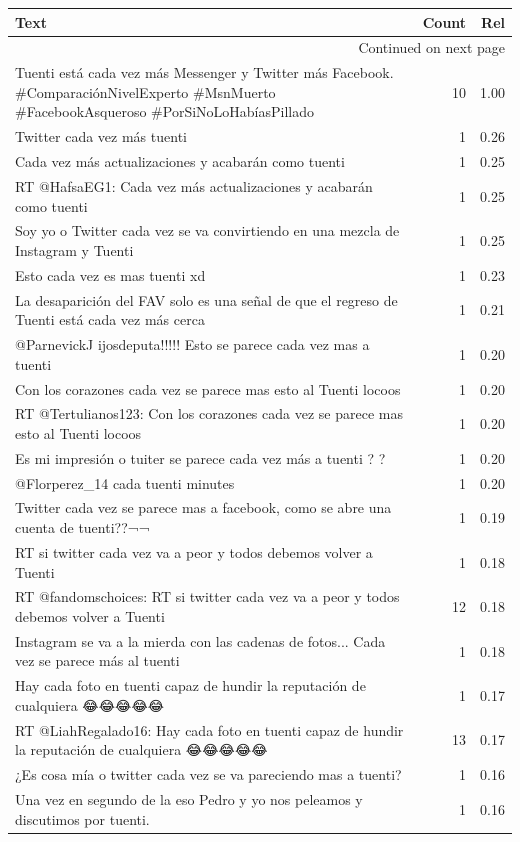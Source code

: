 \begin{longtable}{p{12.5cm}rr}
\toprule
Text & Count & Rel \\
\midrule
\endhead
\midrule
\multicolumn{3}{r}{{Continued on next page}} \\
\midrule
\endfoot

\bottomrule
\endlastfoot
Tuenti está cada vez más Messenger y Twitter más Facebook. \#ComparaciónNivelExperto \#MsnMuerto \#FacebookAsqueroso \#PorSiNoLoHabíasPillado & 10 & 1.00 \\
Twitter cada vez más tuenti & 1 & 0.26 \\
Cada vez más actualizaciones y acabarán como tuenti & 1 & 0.25 \\
RT @HafsaEG1: Cada vez más actualizaciones y acabarán como tuenti & 1 & 0.25 \\
Soy yo o Twitter cada vez se va convirtiendo en una mezcla de Instagram y Tuenti & 1 & 0.25 \\
Esto cada vez es mas tuenti xd & 1 & 0.23 \\
La desaparición del FAV solo es una señal de que el regreso de Tuenti está cada vez más cerca & 1 & 0.21 \\
@ParnevickJ ijosdeputa!!!!! Esto se parece cada vez mas a tuenti & 1 & 0.20 \\
Con los corazones cada vez se parece mas esto al Tuenti locoos & 1 & 0.20 \\
RT @Tertulianos123: Con los corazones cada vez se parece mas esto al Tuenti locoos & 1 & 0.20 \\
Es mi impresión o tuiter se parece cada vez más a tuenti ? ? & 1 & 0.20 \\
@Florperez\_14 cada tuenti minutes & 1 & 0.20 \\
Twitter cada vez se parece mas a facebook, como se abre una cuenta de tuenti??¬¬ & 1 & 0.19 \\
RT si twitter cada vez va a peor y todos debemos volver a Tuenti & 1 & 0.18 \\
RT @fandomschoices: RT si twitter cada vez va a peor y todos debemos volver a Tuenti & 12 & 0.18 \\
Instagram se va a la mierda con las cadenas de fotos... Cada vez se parece más al tuenti & 1 & 0.18 \\
Hay cada foto en tuenti capaz de hundir la reputación de cualquiera 😂😂😂😂😂 & 1 & 0.17 \\
RT @LiahRegalado16: Hay cada foto en tuenti capaz de hundir la reputación de cualquiera 😂😂😂😂😂 & 13 & 0.17 \\
¿Es cosa mía o twitter cada vez se va pareciendo mas a tuenti? & 1 & 0.16 \\
Una vez en segundo de la eso Pedro y yo nos peleamos y discutimos por tuenti. & 1 & 0.16 \\

\end{longtable}
\clearpage

